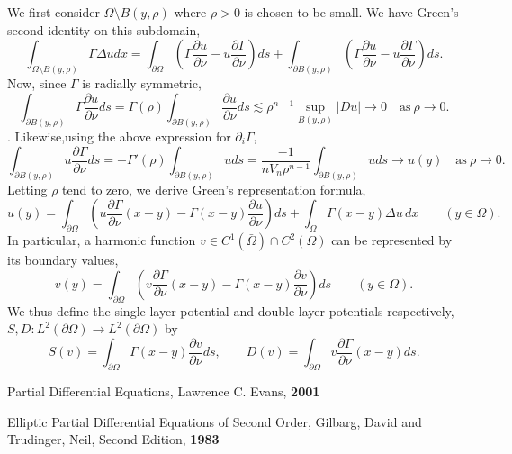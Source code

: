 \documentclass{article}
\begin{document}
We first consider $\Omega \setminus B(y, \rho)$ where $\rho > 0$ is chosen to be small.
We have Green's second identity on this subdomain,
\[
\int_{\Omega \setminus B(y,\rho)} \Gamma \Delta u dx = \int_{\partial \Omega} \left(\Gamma \frac{\partial u}{\partial \nu} - u \frac{\partial \Gamma}{\partial \nu}\right) ds + \int_{\partial B(y,\rho)} \left(\Gamma \frac{\partial u}{\partial \nu} - u \frac{\partial \Gamma}{\partial \nu}\right) ds.
\]
Now, since $\Gamma$ is radially symmetric,
\[
\int_{\partial B(y,\rho)} \Gamma \frac{\partial u}{\partial \nu} ds = \Gamma(\rho) \int_{\partial B(y,\rho)} \frac{\partial u}{\partial \nu} ds
\lesssim \rho^{n-1} \sup_{B(y,\rho)}|Du| \to 0 \quad \text{as}\ \rho \to 0.
\].
Likewise,using the above expression for $\partial_i \Gamma$,
\[
\int_{\partial B(y,\rho)} u \frac{\partial \Gamma}{\partial \nu} ds = -\Gamma'(\rho) \int_{\partial B(y,\rho)} u ds = \frac{-1}{n V_n \rho^{n-1}} \int_{\partial B(y,\rho)} u ds \to u(y)
\quad \text{as}\ \rho \to 0.
\]
Letting $\rho$ tend to zero, we derive Green's representation formula,
\begin{equation}
\label{eq-green_rep}
u(y) = \int_{\partial \Omega} \left( u \frac{\partial \Gamma}{\partial \nu} (x-y) - \Gamma(x-y) \frac{\partial u}{\partial \nu} \right)ds + \int_{\Omega} \Gamma(x-y) \Delta u \, dx
\qquad (y \in \Omega).
\end{equation}
In particular, a harmonic function $v \in C^1(\bar\Omega) \cap C^2(\Omega)$ can be represented by its boundary values,
\[
v(y) = \int_{\partial \Omega} \left( v \frac{\partial \Gamma}{\partial \nu} (x-y) - \Gamma(x-y) \frac{\partial v}{\partial \nu} \right)ds \qquad (y \in \Omega).
\]
We thus define the single-layer potential and double layer potentials respectively, $S,D : L^2(\partial \Omega) \to L^2(\partial \Omega)$ by
\[
S(v) = \int_{\partial \Omega}\Gamma(x-y) \frac{\partial v}{\partial \nu} ds, \qquad D(v) = \int_{\partial \Omega} v \frac{\partial \Gamma}{\partial \nu} (x-y) ds.
\]

\begin{thebibliography}{99}
Partial Differential Equations,
Lawrence C. Evans,
\textbf{2001}

Elliptic Partial Differential Equations of Second Order,
Gilbarg, David and Trudinger, Neil,
Second Edition,
\textbf{1983}

\end{thebibliography}
\end{document}
